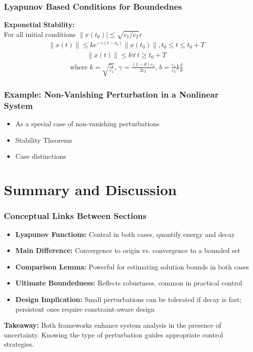 \documentclass[student, noshadow, lsr, english, aspectratio=169, t]{ITR_LSR_slides}
\begin{document}
\begin{frame}
	\frametitle{Lyapunov Based Conditions for Boundednes}
	\textbf{Exponetial Stability:} \\
	For all initial conditions $\|x(t_0)|\leq \sqrt{c_1/c_2}r$
	\begin{align*}
		\|x(t)\| \leq ke^{-\gamma(t-t_0)}\|x(t_0)\|, t_0 \leq t \leq t_0+T
	\end{align*}
	\begin{align*}
		\|x(t)\| \leq b \forall\, t \geq t_0+T
	\end{align*}
	\begin{align*}
		\text{where } k=\sqrt{\frac{c_2}{c_1}},\,\gamma=\frac{(1-\theta)c_3}{2c_2},\, b=\frac{c_4}{c_3}k\frac{\delta}{\theta}
	\end{align*}
\end{frame}

\begin{frame}
	\frametitle{Example: Non-Vanishing Perturbation in a Nonlinear System}
	\begin{itemize}
		\item As a special case of non-vanishing perturbations
		\item Stability Theorems
		\item Case distinctions
	\end{itemize}
\end{frame}

\section{Summary and Discussion}

\begin{frame}
	\frametitle{Conceptual Links Between Sections}
	\begin{itemize}
        \item \textbf{Lyapunov Functions:} Central in both cases, quantify energy and decay
        \item \textbf{Main Difference:} Convergence to origin vs. convergence to a bounded set
        \item \textbf{Comparison Lemma:} Powerful for estimating solution bounds in both cases
        \item \textbf{Ultimate Boundedness:} Reflects robustness, common in practical control
        \item \textbf{Design Implication:} Small perturbations can be tolerated if decay is fast; persistent ones require constraint-aware design
    \end{itemize}

    \vspace{0.5em}
    \textbf{Takeaway:} Both frameworks enhance system analysis in the presence of uncertainty. Knowing the type of perturbation guides appropriate control strategies.
\end{frame}
\end{document}
